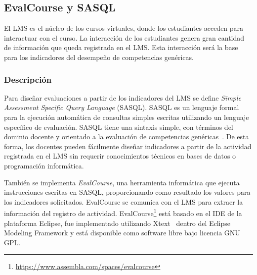 		\subsection{EvalCourse y SASQL} \label{subcha:evc}



	El LMS es el núcleo de los cursos virtuales, donde los estudiantes acceden para interactuar con el curso. La interacción de los estudiantes genera gran cantidad de información que queda registrada en el LMS. Esta interacción será la base para los indicadores del desempeño de competencias genéricas.

			\subsubsection*{Descripción} %

			Para diseñar evaluaciones a partir de los indicadores del LMS se define \emph{Simple Assessment Specific Query Language} (SASQL). SASQL es un lenguaje formal para la ejecución automática de consultas simples escritas utilizando un lenguaje específico de evaluación. SASQL tiene una sintaxis simple, con términos del dominio docente y orientado a la evaluación de competencias genéricas~\cite{Balderas:2013}. De esta forma, los docentes pueden fácilmente diseñar indicadores a partir de la actividad registrada en el LMS sin requerir conocimientos técnicos en bases de datos o programación informática.

			También se implementa \emph{EvalCourse}, una herramienta informática que ejecuta instrucciones escritas en SASQL, proporcionando como resultado los valores para los indicadores solicitados. EvalCourse se comunica con el LMS para extraer la información del registro de actividad. EvalCourse\footnote{\url{https://www.assembla.com/spaces/evalcourse}} está basado en el IDE de la plataforma Eclipse, fue implementado utilizando Xtext~\cite{eysholdt2010xtext} dentro del Eclipse Modeling Framework y está disponible como software libre bajo licencia GNU GPL.


